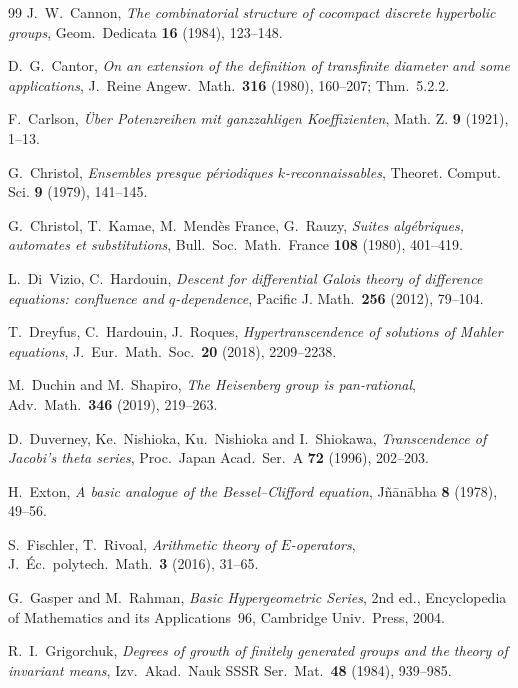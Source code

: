 \documentclass[11pt]{article}
\theoremstyle{plain}
\theoremstyle{definition}
\theoremstyle{remark}
\begin{document}
\begin{thebibliography}{99}
 J.~W.~Cannon, \emph{The combinatorial structure of cocompact discrete
hyperbolic groups}, Geom.\ Dedicata \textbf{16} (1984), 123--148.

 D.~G.~Cantor, \emph{On an extension of the definition of transfinite
diameter and some applications}, J.~Reine Angew.\ Math.\ \textbf{316} (1980), 160--207;
Thm.~5.2.2.

 F.~Carlson, \emph{\"Uber Potenzreihen mit ganzzahligen Koeffizienten},
Math. Z. \textbf{9} (1921), 1--13.

 G.~Christol, \emph{Ensembles presque p\'eriodiques $k$-reconnaissables},
Theoret. Comput. Sci. \textbf{9} (1979), 141--145.

 G.~Christol, T.~Kamae, M.~Mend\`es France, G.~Rauzy, \emph{Suites alg\'ebriques,
automates et substitutions}, Bull.\ Soc.\ Math.\ France \textbf{108} (1980), 401--419.

 L.~Di~Vizio, C.~Hardouin, \emph{Descent for differential Galois theory
of difference equations: confluence and $q$-dependence}, Pacific J. Math.\ \textbf{256} (2012),
79--104.

 T.~Dreyfus, C.~Hardouin, J.~Roques, \emph{Hypertranscendence of solutions of
Mahler equations}, J.~Eur.\ Math.\ Soc.\ \textbf{20} (2018), 2209--2238.

 M.~Duchin and M.~Shapiro, \emph{The Heisenberg group is pan-rational},
Adv.\ Math.\ \textbf{346} (2019), 219--263.

 D.~Duverney, Ke.~Nishioka, Ku.~Nishioka and I.~Shiokawa, \emph{Transcendence
of Jacobi's theta series}, Proc.\ Japan Acad.\ Ser.~A \textbf{72} (1996), 202--203.

 H.~Exton, \emph{A basic analogue of the Bessel--Clifford equation},
J\~n\=an\=abha \textbf{8} (1978), 49--56.

 S.~Fischler, T.~Rivoal, \emph{Arithmetic theory of $E$-operators},
J.~\'Ec.\ polytech.\ Math.\ \textbf{3} (2016), 31--65.

 G.~Gasper and M.~Rahman, \emph{Basic Hypergeometric Series}, 2nd ed.,
Encyclopedia of Mathematics and its Applications~96, Cambridge Univ.\ Press, 2004.

 R.~I.~Grigorchuk, \emph{Degrees of growth of finitely generated groups
and the theory of invariant means}, Izv.\ Akad.\ Nauk SSSR Ser.\ Mat.\ \textbf{48} (1984),
939--985.


\end{thebibliography}
\end{document}
